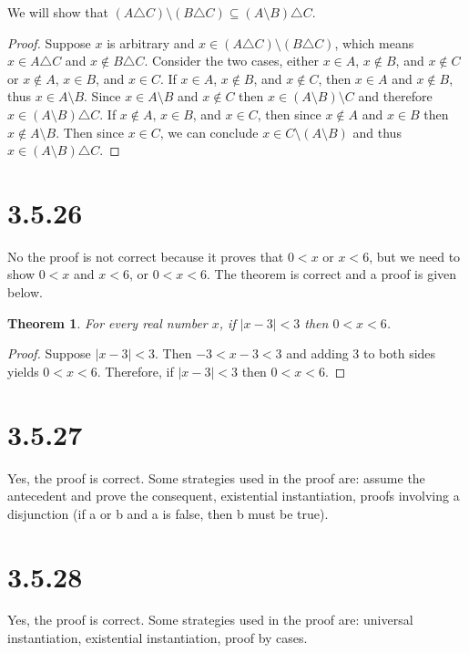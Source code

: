 \documentclass{article}
\newtheorem*{theorem}{Theorem}  %
\begin{document}
We will show that $(A \triangle C) \setminus (B \triangle C) \subseteq (A \setminus B) \triangle C$.
\begin{proof}
Suppose $x$ is arbitrary and $x \in (A \triangle C) \setminus (B \triangle C)$, which means $x \in A \triangle C$ and $x \notin B \triangle C$. Consider the two cases, either $x \in A$, $x \notin B$, and $x \notin C$ or $x \notin A$, $x \in B$, and $x \in C$. If $x \in A$, $x \notin B$, and $x \notin C$, then $x \in A$ and $x \notin B$, thus $x \in A \setminus B$. Since $x \in A \setminus B$ and $x \notin C$ then $x \in (A \setminus B) \setminus C$ and therefore $x \in (A \setminus B) \triangle C$. If $x \notin A$, $x \in B$, and $x \in C$, then since $x \notin A$ and $x \in B$ then $x \notin A \setminus B$. Then since $x \in C$, we can conclude $x \in C \setminus (A \setminus B)$ and thus $x \in (A \setminus B) \triangle C$.
\end{proof}

\section*{3.5.26}
No the proof is not correct because it proves that $0 < x$ or $x < 6$, but we need to show $0 < x$ and $x < 6$, or $0 < x < 6$. The theorem is correct and a proof is given below.

\begin{theorem}  For every real number $x$, if $|x - 3| < 3$ then $0 < x < 6$.
\end{theorem}

\begin{proof}
Suppose $|x-3| < 3$. Then $-3 < x - 3 < 3$ and adding 3 to both sides yields $0 < x < 6$. Therefore, if $|x - 3| < 3$ then $0 < x < 6$.
\end{proof}

\section*{3.5.27}
Yes, the proof is correct. Some strategies used in the proof are: assume the antecedent and prove the consequent, existential instantiation, proofs involving a disjunction (if a or b and a is false, then b must be true).

\section*{3.5.28}
Yes, the proof is correct. Some strategies used in the proof are: universal instantiation, existential instantiation, proof by cases.
\end{document}
